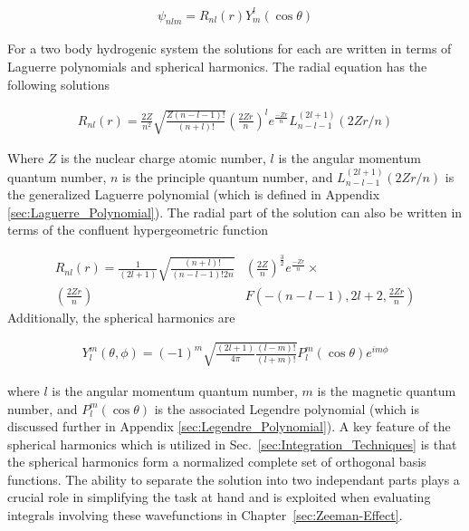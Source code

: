         \begin{align}
            \psi_{nlm} = R_{nl}(r) Y^l_m (\cos \theta)
        \end{align}

        \noindent For a two body hydrogenic system the solutions for each are written in terms of Laguerre polynomials and spherical harmonics. The radial equation has the following solutions \cite{Atomic_Physics_Handbook}

        \begin{align}
            R_{nl}(r) = \frac{2Z}{n^2} \sqrt{\frac{Z(n - l - 1)!}{(n + l)!}} \left( \frac{2Zr}{n} \right)^l e^{\frac{-Zr}{n}} L_{n - l - 1}^{(2l + 1)} \left( 2Zr/n \right) \label{eq:radial_equation}
        \end{align}

       \noindent Where $Z$ is the nuclear charge atomic number, $l$ is the angular momentum quantum number, $n$ is the principle quantum number, and $L_{n - l - 1}^{(2l + 1)} (2Zr/n)$ is the generalized Laguerre polynomial (which is defined in Appendix \ref{sec:Laguerre_Polynomial}). The radial part of the solution can also be written in terms of the confluent hypergeometric function \cite{Bethe_Salpeter_1977}

        \begin{align}
            R_{nl}(r) = \frac{1}{(2l + 1)} \sqrt{\frac{(n+l)!}{(n - l - 1)! 2n}}& \left( \frac{2Z}{n} \right)^{\frac{3}{2}} e^{\frac{-Zr}{n}} \times \\
            \left(\frac{2Zr}{n} \right) &F\left(-(n - l - 1), 2l + 2, \frac{2Zr}{n}\right) \nonumber
        \end{align}
       \noindent Additionally, the spherical harmonics are

        \begin{align}
            Y^m_l (\theta, \phi) = (-1)^m \sqrt{\frac{(2l + 1)}{4 \pi}\frac{(l - m)!}{(l + m)!}} P_l^m (\cos \theta) e^{i m \phi} \label{eq:angular_equation}
        \end{align}

        where $l$ is the angular momentum quantum number, $m$ is the magnetic quantum number, and $P_l^m (\cos \theta)$ is the associated Legendre polynomial (which is discussed further in Appendix \ref{sec:Legendre_Polynomial}). A key feature of the spherical harmonics which is utilized in Sec.~\ref{sec:Integration_Techniques} is that the spherical harmonics form a normalized complete set of orthogonal basis functions. The ability to separate the solution into two independant parts plays a crucial role in simplifying the task at hand and is exploited when evaluating integrals involving these wavefunctions in Chapter~\ref{sec:Zeeman-Effect}.

